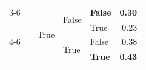 \documentclass{article}
\begin{document}
\begin{table}
\begin{center}
{\begin{tabular}{@{}lllllr@{}}
    \cmidrule{3-6}
                                                &                                   & \multirow[c]{4}{*}{True}  & \multirow[c]{2}{*}{False} & \textbf{False}        & \textbf{0.30} \\
                                                &                                   &                           &                           & True                  & 0.23 \\
    \cmidrule{4-6}
                                                &                                   &                           & \multirow[c]{2}{*}{True}  & False                 & 0.38 \\
                                                &                                   &                           &                           & \textbf{True}         & \textbf{0.43} \\
   \bottomrule
\end{tabular}
}
    \end{center}
    \label{tab:past-actions-ablation-gemini-flash-exp}
\end{table}
\end{document}
